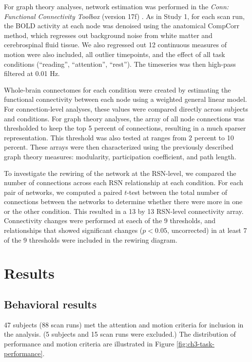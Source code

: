 For graph theory analyses, network estimation was performed in the \textit{Conn: Functional Connectivity Toolbox} (version 17f) \citep{WhitfieldGabrieli2012}. As in Study 1, for each scan run, the BOLD activity at each node was denoised using the anatomical CompCorr method, which regresses out background noise from white matter and cerebrospinal fluid tissue. We also regressed out 12 continuous measures of motion were also included, all outlier timepoints, and the effect of all task conditions (``reading'', ``attention'', ``rest''). The timeseries was then high-pass filtered at 0.01 Hz.

Whole-brain connectomes for each condition were created by estimating the functional connectivity between each node using a weighted general linear model. For connection-level analyses, these values were compared directly across subjects and conditions. For graph theory analyses, the array of all node connections was thresholded to keep the top 5 percent of connections, resulting in a much sparser representation. This threshold was also tested at ranges from 2 percent to 10 percent. These arrays were then characterized using the previously described graph theory measures: modularity, participation coefficient, and path length.

To investigate the rewiring of the network at the RSN-level, we compared the number of connections across each RSN relationship at each condition. For each pair of networks, we computed a paired $t$-test between the total number of connections between the networks to determine whether there were more in one or the other condition. This resulted in a 13 by 13 RSN-level connectivity array. Connectivity changes were performed at eaech of the 9 thresholds, and relationships that showed significant changes ($p < 0.05$, uncorrected) in at least 7 of the 9 thresholds were included in the rewiring diagram.


\section{Results}

\subsection{Behavioral results}

47 subjects (88 scan runs) met the attention and motion criteria for inclusion in the analysis. (5 subjects and 15 scan runs were excluded.) The distribution of performance and motion criteria are illustrated in Figure \ref{fig:ch3-task-performance}. 

